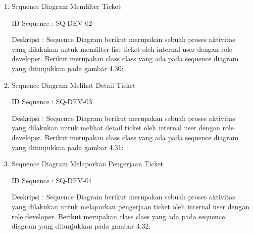 \documentclass[12pt]{article}
\begin{document}
\begin{enumerate}[label=\textbf{4.\arabic*.}]
\begin{enumerate} [label=\textbf{4.2.\arabic*.}, wide, labelwidth=!, labelindent=0pt]
\begin{enumerate}[label=\textbf{4.2.2.\arabic*.}, wide, labelwidth=!, labelindent=0pt]
\begin{enumerate}[label=\arabic*.]
                \item Sequence Diagram Memfilter Ticket
                
                \noindent ID Sequence	: SQ-DEV-02
                
                \noindent Deskripsi	: Sequence Diagram berikut merupakan sebuah proses aktivitas yang dilakukan untuk memfilter list ticket oleh internal user dengan role developer. Berikut merupakan class class yang ada pada sequence diagram yang ditunjukkan pada gambar 4.30:
                
                
                \item Sequence Diagram Melihat Detail Ticket
                
                \noindent ID Sequence	: SQ-DEV-03
                
                \noindent Deskripsi	: Sequence Diagram berikut merupakan sebuah proses aktivitas yang dilakukan untuk melihat detail ticket oleh internal user dengan role developer. Berikut merupakan class class yang ada pada sequence diagram yang ditunjukkan pada gambar 4.31:
                
                
                \item Sequence Diagram Melaporkan Pengerjaan Ticket
                
                \noindent ID Sequence	: SQ-DEV-04
                
                \noindent Deskripsi	: Sequence Diagram berikut merupakan sebuah proses aktivitas yang dilakukan untuk melaporkan pengerjaan ticket oleh internal user dengan role developer. Berikut merupakan class class yang ada pada sequence diagram yang ditunjukkan pada gambar 4.32:
                

\end{enumerate}
\end{enumerate}
\end{enumerate}
\end{enumerate}
\end{document}
